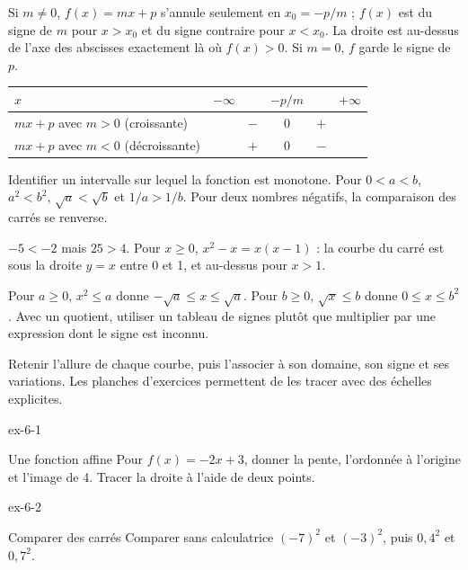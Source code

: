 \begin{propriete}
Si $m\ne0$, $f(x)=mx+p$ s’annule seulement en $x_0=-p/m$ ; $f(x)$ est du signe de $m$ pour $x>x_0$ et du signe contraire pour $x<x_0$. La droite est au-dessus de l’axe des abscisses exactement là où $f(x)>0$. Si $m=0$, $f$ garde le signe de $p$.
\begin{center}\renewcommand{\arraystretch}{1.25}\begin{tabular}{l|ccccc}\toprule
$x$ & $-\infty$ & & $-p/m$ & & $+\infty$\\\midrule
$mx+p$ avec $m>0$ (croissante) & & $-$ & $0$ & $+$ & \\
$mx+p$ avec $m<0$ (décroissante) & & $+$ & $0$ & $-$ & \\\bottomrule
\end{tabular}\end{center}
\end{propriete}
\begin{savoirfaire}
Identifier un intervalle sur lequel la fonction est monotone. Pour $0<a<b$, $a^2<b^2$, $\sqrt a<\sqrt b$ et $1/a>1/b$. Pour deux nombres négatifs, la comparaison des carrés se renverse.
\end{savoirfaire}
\begin{exemple}$-5<-2$ mais $25>4$. Pour $x\ge0$, $x^2-x=x(x-1)$ : la courbe du carré est sous la droite $y=x$ entre 0 et 1, et au-dessus pour $x>1$.\end{exemple}
\begin{savoirfaire}[Résoudre]
Pour $a\ge0$, $x^2\le a$ donne $-\sqrt a\le x\le\sqrt a$. Pour $b\ge0$, $\sqrt x\le b$ donne $0\le x\le b^2$. Avec un quotient, utiliser un tableau de signes plutôt que multiplier par une expression dont le signe est inconnu.
\end{savoirfaire}
Retenir l’allure de chaque courbe, puis l’associer à son domaine, son signe et ses variations. Les planches d’exercices permettent de les tracer avec des échelles explicites.
\clearpage{}
\begin{blocLivre}{ex-6-1}
\begin{exercice}[1]{Une fonction affine}
Pour $f(x)=-2x+3$, donner la pente, l’ordonnée à l’origine et l’image de 4. Tracer la droite à l’aide de deux points.
\label{fig-ex-6-1}
\end{exercice}
\end{blocLivre}
\begin{blocLivre}{ex-6-2}
\begin{exercice}[1]{Comparer des carrés}
Comparer sans calculatrice $(-7)^2$ et $(-3)^2$, puis $0{,}4^2$ et $0{,}7^2$.
\end{exercice}
\end{blocLivre}
